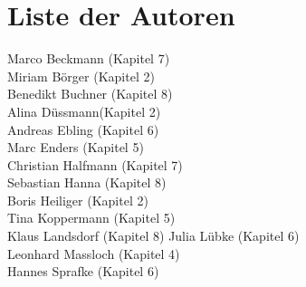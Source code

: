\chapter*{Liste der Autoren}
Marco Beckmann (Kapitel 7)\\
Miriam Börger (Kapitel 2)\\
Benedikt Buchner (Kapitel 8)\\
Alina Düssmann(Kapitel 2)\\
Andreas Ebling (Kapitel 6)\\
Marc Enders (Kapitel 5)\\
Christian Halfmann (Kapitel 7)\\
Sebastian Hanna (Kapitel 8)\\
Boris Heiliger (Kapitel 2)\\
Tina Koppermann (Kapitel 5)\\
Klaus Landsdorf (Kapitel 8)
Julia Lübke (Kapitel 6)\\
Leonhard Massloch (Kapitel 4)\\
Hannes Sprafke (Kapitel 6)\\
